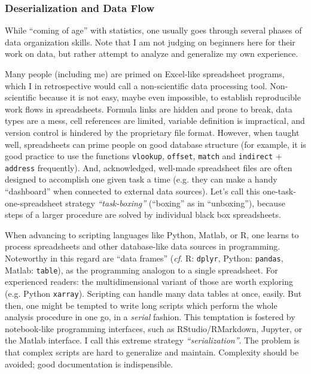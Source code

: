 \subsubsection{Deserialization and Data Flow}
\label{workflow:deserialization}
While ``coming of age'' with statistics, one usually goes through several phases of data organization skills.
Note that I am not judging on beginners here for their work on data, but rather attempt to analyze and generalize my own experience.

Many people (including me) are primed on Excel-like spreadsheet programs, which I in retrospective would call a non-scientific data processing tool.
Non-scientific because it is not easy, maybe even impossible, to establish reproducible work flows in spreadsheets.
Formula links are hidden and prone to break, data types are a mess, cell references are limited, variable definition is impractical, and version control is hindered by the proprietary file format.
However, when taught well, spreadsheets can prime people on good database structure (for example, it is good practice to use the functions \texttt{vlookup}, \texttt{offset}, \texttt{match} and \texttt{indirect} + \texttt{address} frequently).
And, acknowledged, well-made spreadsheet files are often designed to accomplish one given task a time (e.g. they can make a handy ``dashboard'' when connected to external data sources).
Let's call this one-task-one-spreadsheet strategy \emph{``task-boxing''} (``boxing'' as in ``unboxing''), because steps of a larger procedure are solved by individual black box spreadsheets.

When advancing to scripting languages like Python, Matlab, or R, one learns to process spreadsheets and other database-like data sources in programming.
Noteworthy in this regard are ``data frames'' (\emph{cf.} R: \texttt{dplyr}, Python: \texttt{pandas}, Matlab: \texttt{table}), as the programming analogon to a single spreadsheet.
For experienced readers: the multidimensional variant of those are worth exploring (e.g. Python \texttt{xarray}).
Scripting can handle many data tables at once, easily.
But then, one might be tempted to write long scripts which perform the whole analysis procedure in one go, in a \emph{serial} fashion.
This temptation is fostered by notebook-like programming interfaces, such as RStudio/RMarkdown, Jupyter, or the Matlab interface.
I call this extreme strategy \emph{``serialization''}.
The problem is that complex scripts are hard to generalize and maintain.
Complexity should be avoided; good documentation is indispensible.

